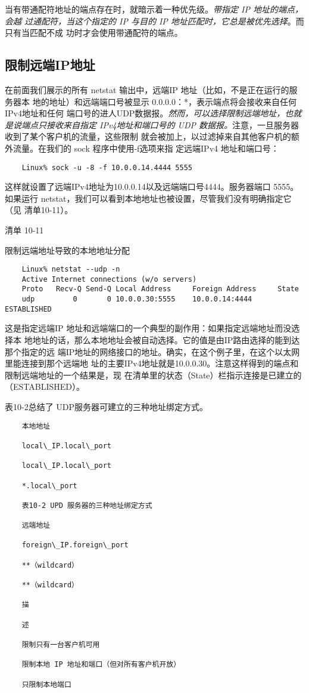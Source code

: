 当有带通配符地址的端点存在时，就暗示着一种优先级。\emph{带指定 IP 地址的端点，会越
过通配符，当这个指定的 IP 与目的 IP 地址匹配时，它总是被优先选择}。而只有当匹配不成
功时才会使用带通配符的端点。

\subsection{限制远端IP地址}
在前面我们展示的所有 netstat 输出中，远端IP 地址（比如，不是正在运行的服务器本
地的地址）和远端端口号被显示 0.0.0.0：*，表示端点将会接收来自任何IPv4地址和任何
端口号的进人UDP数据报。\emph{然而，可以选择限制远端地址，也就是说端点只接收来自指定
IPv4地址和端口号的 UDP 数据报。}注意，一旦服务器收到了某个客户机的流量，这些限制
就会被加上，以过滤掉来自其他客户机的额外流量。在我们的 sock 程序中使用-f选项来指
定远端IPv4 地址和端口号：

\begin{verbatim}
    Linux% sock -u -8 -f 10.0.0.14.4444 5555
\end{verbatim}

这样就设置了远端IPv4地址为10.0.0.14以及远端端口号4444。服务器端口
5555。如果运行 netstat，我们可以看到本地地址也被设置，尽管我们没有明确指定它（见
清单10-11）。

清单 10-11

限制远端地址导致的本地地址分配

\begin{verbatim}
    Linux% netstat --udp -n
    Active Internet connections (w/o servers)
    Proto   Recv-Q Send-Q Local Address     Foreign Address     State
    udp         0       0 10.0.0.30:5555    10.0.0.14:4444      ESTABLISHED
\end{verbatim}

这是指定远端IP 地址和远端端口的一个典型的副作用：如果指定远端地址而没选择本
地地址的话，那么本地地址会被自动选择。它的值是由IP路由选择的能到达那个指定的远
端IP地址的网络接口的地址。确实，在这个例子里，在这个以太网里能连接到那个远端地
址的主要IPv4地址就是10.0.0.30。注意这样得到的端点和限制远端地址的一个结果是，现
在清单里的状态（State）栏指示连接是已建立的（ESTABLISHED）。

表10-2总结了 UDP服务器可建立的三种地址绑定方式。

\begin{verbatim}
    本地地址

    local\_IP.local\_port

    local\_IP.local\_port

    *.local\_port

    表10-2 UPD 服务器的三种地址绑定方式

    远端地址

    foreign\_IP.foreign\_port

    **（wildcard）

    **（wildcard）

    描

    述

    限制只有一台客户机可用

    限制本地 IP 地址和端口（但对所有客户机开放）

    只限制本地端口
\end{verbatim}

